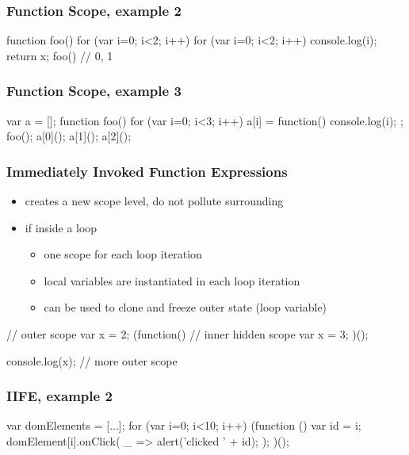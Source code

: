 \begin{frame}[fragile] \frametitle{Function Scope, example 2}

\begin{CodeBox}{}
function foo() {
  for (var i=0; i<2; i++) {
    for (var i=0; i<2; i++) {
      console.log(i);
    }
  }
  return x;
}
foo()  // 0, 1
\end{CodeBox}
\end{frame}

\begin{frame}[fragile] \frametitle{Function Scope, example 3}

\begin{CodeBox}{}
var a = [];
function foo() {
  for (var i=0; i<3; i++) {
    a[i] = function() { console.log(i); };
  }
}
foo();
a[0]();
a[1]();
a[2]();
\end{CodeBox}
\end{frame}

\begin{frame}[fragile] \frametitle{Immediately Invoked Function Expressions}
\begin{itemize}
  \item creates a new scope level, do not pollute surrounding
  \item if inside a loop
  \begin{itemize}
    \item one scope for each loop iteration
    \item local variables are instantiated in each loop iteration
    \item can be used to clone and freeze outer state (loop variable)
  \end{itemize}
\end{itemize}

\begin{CodeBox}{}
// outer scope
var x = 2;
(function() {
  // inner hidden scope
  var x = 3;
})();

console.log(x);
// more outer scope
\end{CodeBox}
\end{frame}

\begin{frame}[fragile] \frametitle{IIFE, example 2}

\begin{CodeBox}{}
var domElements = [...];
for (var i=0; i<10; i++) {
  (function () {
    var id = i;
    domElement[i].onClick(
      _ => { alert('clicked ' + id); }
    );
  })();  
}
\end{CodeBox}
\end{frame}

